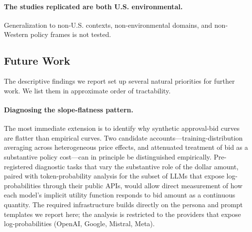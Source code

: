\documentclass[12pt]{article}
\begin{document}
\paragraph{The studies replicated are both U.S. environmental.}
Generalization to non-U.S. contexts, non-environmental domains, and
non-Western policy frames is not tested.

\subsection{Future Work}\label{sec:disc-future-work}

The descriptive findings we report set up several natural priorities for
further work. We list them in approximate order of tractability.

\paragraph{Diagnosing the slope-flatness pattern.} The most immediate
extension is to identify why synthetic approval-bid curves are flatter
than empirical curves. Two candidate accounts---training-distribution
averaging across heterogeneous price effects, and attenuated treatment
of bid as a substantive policy cost---can in principle be distinguished
empirically. Pre-registered diagnostic tasks that vary the substantive
role of the dollar amount, paired with token-probability analysis for
the subset of LLMs that expose log-probabilities through their public
APIs, would allow direct measurement of how each model's implicit
utility function responds to bid amount as a continuous quantity. The
required infrastructure builds directly on the persona and prompt
templates we report here; the analysis is restricted to the providers
that expose log-probabilities (OpenAI, Google, Mistral, Meta).

\end{document}
